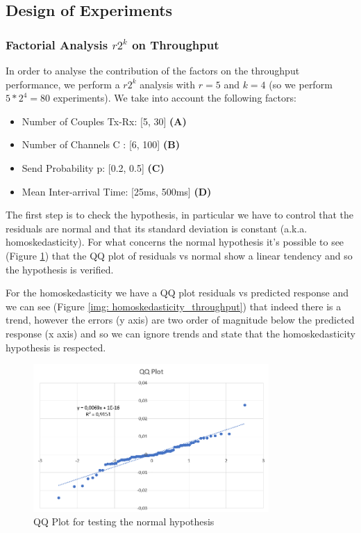 \subsection{Design of Experiments}
\subsubsection{Factorial Analysis $r2^k$ on Throughput}
In order to analyse the contribution of the factors on the throughput performance, we perform a $r2^k$ analysis with $r=5$ and $k=4$ (so we perform $5*2^4 = 80$ experiments). We take into account the following factors:
\begin{itemize}
	\item Number of Couples Tx-Rx: [5, 30] \textbf{(A)}
	\item Number of Channels C : [6, 100] \textbf{(B)}
	\item Send Probability p: [0.2, 0.5] \textbf{(C)}
	\item Mean Inter-arrival Time: [25ms, 500ms] \textbf{(D)}    
\end{itemize}

\noindent The first step is to check the hypothesis, in particular we have to control that the residuals are normal and that its standard deviation is constant (a.k.a. homoskedasticity). For what concerns the normal hypothesis it's possible to see (Figure \ref{img: qqplot_throughput}) that the QQ plot of residuals vs normal show a linear tendency and so the hypothesis is verified.

\noindent For the homoskedasticity we have a QQ plot residuals vs predicted response and we can see (Figure \ref{img: homoskedasticity_throughput}) that indeed there is a trend, however the errors (y axis) are two order of magnitude below the predicted response (x axis) and so we can ignore trends and state that the homoskedasticity hypothesis is respected.

\begin{figure}[H]
	\centering
	\includegraphics[width=0.8\textwidth]{img/QQplot_2kr_throughput.png}
	\caption{QQ Plot for testing the normal hypothesis}
	\label {img: qqplot_throughput}
\end{figure}

